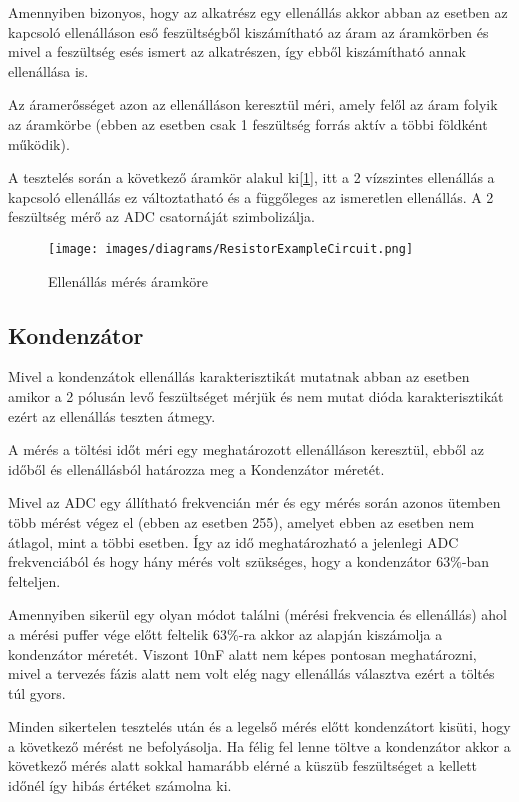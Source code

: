 Amennyiben bizonyos, hogy az alkatrész egy ellenállás akkor
abban az esetben az kapcsoló ellenálláson eső feszültségből kiszámítható
az áram az áramkörben és mivel a feszültség esés ismert az alkatrészen,
így ebből kiszámítható annak ellenállása is.

Az áramerősséget azon az ellenálláson keresztül méri, amely 
felől az áram folyik az áramkörbe (ebben az esetben csak 1 feszültség
forrás aktív a többi földként működik).

A tesztelés során a következő áramkör alakul ki[\ref{fig:ResistorExampleCircuit}], 
itt a 2 
vízszintes ellenállás a kapcsoló ellenállás ez változtatható
és a függőleges az ismeretlen ellenállás. A 2 feszültség mérő az ADC
csatornáját szimbolizálja.

\begin{figure}[H]
    \centering
    \texttt{[image: images/diagrams/ResistorExampleCircuit.png]}
    \caption{Ellenállás mérés áramköre}
    \label{fig:ResistorExampleCircuit}
\end{figure}

\subsection{Kondenzátor}

Mivel a kondenzátok ellenállás karakterisztikát mutatnak abban az esetben
amikor a 2 pólusán levő feszültséget mérjük és nem mutat 
dióda karakterisztikát ezért az ellenállás 
teszten átmegy.

A mérés a töltési időt méri egy meghatározott ellenálláson keresztül,
ebből az időből és ellenállásból határozza meg a Kondenzátor méretét.

Mivel az ADC egy állítható frekvencián mér és egy mérés során azonos ütemben
több mérést végez el (ebben az esetben 255), amelyet ebben az esetben
nem átlagol, mint a többi esetben. Így az idő meghatározható a jelenlegi
ADC frekvenciából és hogy hány mérés volt szükséges, hogy a kondenzátor
63\%-ban felteljen.

Amennyiben sikerül egy olyan módot találni (mérési frekvencia és ellenállás)
ahol a mérési puffer vége előtt feltelik 63\%-ra akkor az alapján kiszámolja
a kondenzátor méretét. Viszont 10nF alatt nem képes pontosan meghatározni,
mivel a tervezés fázis alatt nem volt elég nagy ellenállás választva
ezért a töltés túl gyors.

Minden sikertelen tesztelés után és a legelső mérés előtt kondenzátort kisüti, 
hogy a következő mérést ne befolyásolja. Ha félig fel lenne töltve a kondenzátor
akkor a következő mérés alatt sokkal hamarább elérné a küszüb feszültséget
a kellett időnél így hibás értéket számolna ki.




